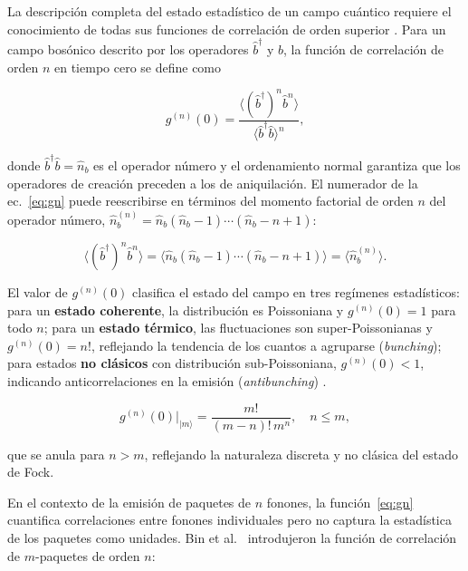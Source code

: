 La descripción completa del estado estadístico de un campo cuántico requiere el conocimiento de todas sus funciones de correlación de orden superior \cite{glauber1963}. Para un campo bosónico descrito por los operadores $\hat{b}^\dagger$ y $\hat{b}$, la función de correlación de orden $n$ en tiempo cero se define como

\begin{equation}
	g^{(n)}(0) = \frac{\langle(\hat{b}^\dagger)^n\hat{b}^n\rangle} {\langle\hat{b}^\dagger\hat{b}\rangle^n},
	\label{eq:gn}
\end{equation}

donde $\hat{b}^\dagger\hat{b} = \hat{n}_b$ es el operador número y el ordenamiento normal garantiza que los operadores de creación preceden a los de aniquilación. El numerador de la ec.~\eqref{eq:gn} puede reescribirse en términos del momento factorial de orden $n$ del operador número,
$\hat{n}_b^{(n)} = \hat{n}_b(\hat{n}_b-1)\cdots(\hat{n}_b-n+1)$:

\begin{equation}
	\langle(\hat{b}^\dagger)^n\hat{b}^n\rangle =
	\langle\hat{n}_b(\hat{n}_b-1)\cdots(\hat{n}_b-n+1)\rangle
	= \langle\hat{n}_b^{(n)}\rangle.
	\label{eq:factorial_moment}
\end{equation}

El valor de $g^{(n)}(0)$ clasifica el estado del campo en tres regímenes estadísticos: para un \textbf{estado coherente}, la distribución es Poissoniana y $g^{(n)}(0) = 1$ para todo $n$; para un \textbf{estado térmico}, las fluctuaciones son super-Poissonianas y $g^{(n)}(0) = n!$, reflejando la tendencia de los cuantos a agruparse (\textit{bunching}); para estados \textbf{no clásicos} con distribución sub-Poissoniana, $g^{(n)}(0) < 1$, indicando anticorrelaciones en la emisión (\textit{antibunching}) \cite{gerry2005,fox2006}.

\begin{equation}
	g^{(n)}(0)\big|_{|m\rangle} =
	\frac{m!}{(m-n)!\,m^n}, \quad n \leq m,
	\label{eq:gn_fock}
\end{equation}

que se anula para $n > m$, reflejando la naturaleza discreta y no clásica del estado de Fock.

En el contexto de la emisión de paquetes de $n$ fonones, la función~\eqref{eq:gn} cuantifica correlaciones entre fonones individuales pero no captura la estadística de los paquetes como unidades. Bin et al.\ \cite{bin2020} introdujeron la función de correlación de $m$-paquetes de orden $n$:


